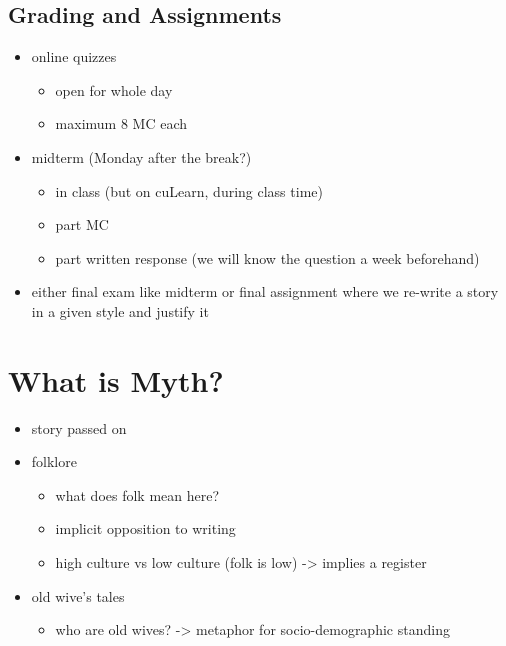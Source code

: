 \documentclass[
  12pt]{findlay}
\providecommand{\tightlist}{%
  \setlength{\itemsep}{0pt}\setlength{\parskip}{0pt}}
\begin{document}
\hypertarget{grading-and-assignments}{%
\subsection{Grading and Assignments}\label{grading-and-assignments}}

\begin{itemize}
\tightlist
\item
  online quizzes

  \begin{itemize}
  \tightlist
  \item
    open for whole day
  \item
    maximum 8 MC each
  \end{itemize}
\item
  midterm (Monday after the break?)

  \begin{itemize}
  \tightlist
  \item
    in class (but on cuLearn, during class time)
  \item
    part MC
  \item
    part written response (we will know the question a week beforehand)
  \end{itemize}
\item
  either final exam like midterm or final assignment where we re-write a
  story in a given style and justify it
\end{itemize}

\hypertarget{what-is-myth}{%
\section{What is Myth?}\label{what-is-myth}}

\begin{itemize}
\tightlist
\item
  story passed on
\item
  folklore

  \begin{itemize}
  \tightlist
  \item
    what does folk mean here?
  \item
    implicit opposition to writing
  \item
    high culture vs low culture (folk is low) -\textgreater{} implies a
    register
  \end{itemize}
\item
  old wive's tales

  \begin{itemize}
  \tightlist
  \item
    who are old wives? -\textgreater{} metaphor for socio-demographic
    standing
  \end{itemize}
\end{itemize}
\end{document}
